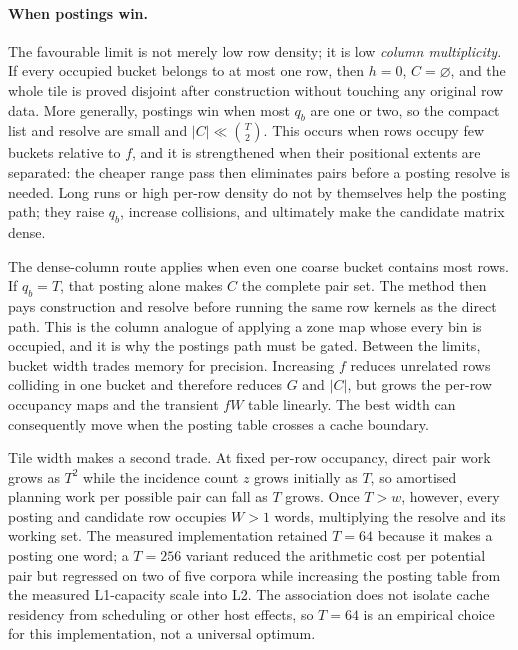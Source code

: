 \paragraph*{When postings win.}
The favourable limit is not merely low row density; it is low \emph{column multiplicity}. If every
occupied bucket belongs to at most one row, then $h=0$, $C=\varnothing$, and the whole tile is proved
disjoint after construction without touching any original row data. More generally, postings win
when most $q_b$ are one or two, so the compact list and resolve are small and
$|C|\ll\binom{T}{2}$.
This occurs when rows occupy few buckets relative to $f$, and it is strengthened when their positional
extents are separated: the cheaper range pass then eliminates pairs before a posting resolve is
needed. Long runs or high per-row density do not by themselves help the posting path; they raise
$q_b$, increase collisions, and ultimately make the candidate matrix dense.

The dense-column route applies when even one coarse bucket contains most rows. If $q_b=T$, that posting
alone makes $C$ the complete pair set. The method then pays construction and resolve before running
the same row kernels as the direct path. This is the column analogue of applying a zone map whose
every bin is occupied, and it is why the postings path must be gated. Between the limits, bucket
width trades memory for precision. Increasing $f$ reduces unrelated rows colliding in one bucket and
therefore reduces $G$ and $|C|$, but grows the per-row occupancy maps and the transient $fW$ table
linearly. The best width can consequently move when the posting table crosses a cache boundary.

Tile width makes a second trade. At fixed per-row occupancy, direct pair work grows as $T^2$ while
the incidence count $z$ grows initially as $T$, so amortised planning work per possible pair can fall
as $T$ grows. Once $T>w$, however, every posting and candidate row occupies $W>1$ words, multiplying
the resolve and its working set. The measured implementation retained $T=64$ because it makes a
posting one word; a $T=256$ variant reduced the arithmetic cost per potential pair but regressed on
two of five corpora while increasing the posting table from the measured L1-capacity scale into L2.
The association does not isolate cache residency from scheduling or other host effects, so $T=64$ is
an empirical choice for this implementation, not a universal optimum.

